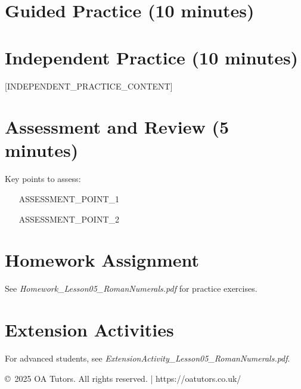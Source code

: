 \documentclass[a4paper,12pt]{article}
\begin{document}
\section{Guided Practice (10 minutes)}
\begin{activity}
\end{activity}

\section{Independent Practice (10 minutes)}
[INDEPENDENT_PRACTICE_CONTENT]

\section{Assessment and Review (5 minutes)}
\begin{note}
Key points to assess:
\begin{itemize}
    \item [ASSESSMENT_POINT_1]
    \item [ASSESSMENT_POINT_2]
\end{itemize}
\end{note}

\section{Homework Assignment}
See \textit{Homework\_Lesson05\_RomanNumerals.pdf} for practice exercises.

\section{Extension Activities}
For advanced students, see \textit{ExtensionActivity\_Lesson05\_RomanNumerals.pdf}.

\vfill
\begin{center}
\textcolor{oagray}{\small \copyright\ 2025 OA Tutors. All rights reserved. | https://oatutors.co.uk/}
\end{center}
\end{document}
